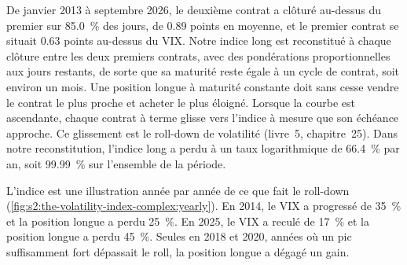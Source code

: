 De janvier 2013 à septembre 2026, le deuxième contrat a clôturé au-dessus du premier sur 85.0~\% des jours, de 0.89 points en moyenne, et le premier contrat
se situait 0.63 points au-dessus du VIX. Notre indice long est reconstitué à chaque clôture
entre les deux premiers contrats, avec des pondérations proportionnelles aux jours restants, de sorte que sa maturité reste égale à un cycle de contrat, soit environ un mois.
Une position longue à maturité constante doit sans cesse vendre le contrat le plus proche et acheter le plus éloigné. Lorsque la courbe est
ascendante, chaque contrat à terme glisse vers l'indice à mesure que son échéance approche. Ce glissement est le roll-down de volatilité (livre~5, chapitre~25). Dans notre
reconstitution, l'indice long a perdu à un taux logarithmique de 66.4~\% par an, soit 99.99~\% sur l'ensemble de la période.

\begin{omfigure}

\label{fig:s2:the-volatility-index-complex:yearly}
\end{omfigure}

L'indice est une illustration année par année de ce que fait le roll-down (\cref{fig:s2:the-volatility-index-complex:yearly}). En 2014, le VIX a progressé de 35~\% et la
position longue a perdu 25~\%. En 2025, le VIX a reculé de 17~\% et la position longue a perdu 45~\%. Seules en 2018 et 2020, années où un pic suffisamment fort dépassait le
roll, la position longue a dégagé un gain.

